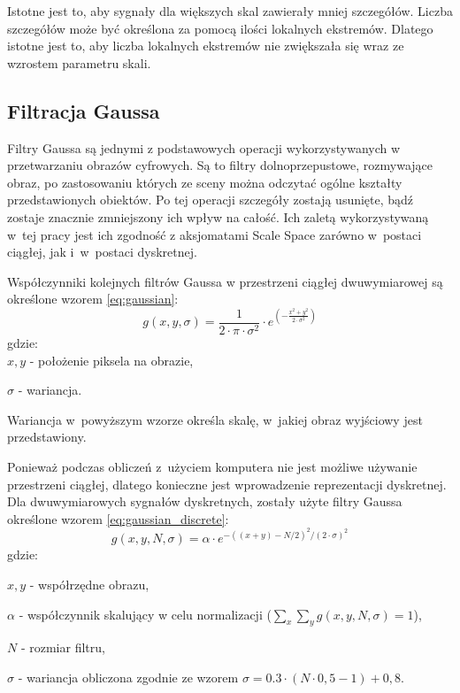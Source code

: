 Istotne jest to, aby sygnały dla większych skal zawierały mniej szczegółów. Liczba szczegółów może być określona za pomocą ilości lokalnych ekstremów. Dlatego istotne jest to, aby liczba lokalnych ekstremów nie zwiększała się wraz ze wzrostem parametru skali.

\subsection{Filtracja Gaussa}
\label{subsec:filtracjaGaussa}
Filtry Gaussa są jednymi z podstawowych operacji wykorzystywanych w przetwarzaniu obrazów cyfrowych. Są to filtry dolnoprzepustowe, rozmywające obraz, po zastosowaniu których ze sceny można odczytać ogólne kształty przedstawionych obiektów. Po tej operacji szczegóły zostają usunięte, bądź zostaje znacznie zmniejszony ich wpływ na całość. Ich zaletą wykorzystywaną w~tej pracy jest ich zgodność z aksjomatami Scale Space zarówno w~postaci ciągłej, jak i~w~postaci dyskretnej.

Współczynniki kolejnych filtrów Gaussa w przestrzeni ciągłej dwuwymiarowej są określone wzorem \ref{eq:gaussian}:
\begin{equation}
\label{eq:gaussian}
g(x,y,\sigma)=\frac{1}{2 \cdot \pi \cdot \sigma^ {2} }\cdot e^{(-\frac{x^{2} + y^{2}}{2 \cdot \sigma ^{2}})}
\end{equation}
gdzie:\\

$ x,y $ - położenie piksela na obrazie,

$ \sigma $ - wariancja.

Wariancja w~powyższym wzorze określa skalę, w~jakiej obraz wyjściowy jest przedstawiony. 

Ponieważ podczas obliczeń z~użyciem komputera nie jest możliwe używanie przestrzeni ciągłej, dlatego konieczne jest wprowadzenie reprezentacji dyskretnej. 
Dla dwuwymiarowych sygnałów dyskretnych, zostały użyte filtry Gaussa określone wzorem \ref{eq:gaussian_discrete}:
\begin{equation}
\label{eq:gaussian_discrete}
g(x,y,N,\sigma) = \alpha \cdot e^{-((x+y)-N/2)^2/(2 \cdot \sigma)^2}
\end{equation}
gdzie:

$ x, y$ - współrzędne obrazu,

$ \alpha $ - współczynnik skalujący w celu normalizacji ($ \sum_x \sum_y g(x,y,N,\sigma) = 1 $),

$ N $ - rozmiar filtru,

$ \sigma $ - wariancja obliczona zgodnie ze wzorem $ \sigma = 0.3 \cdot (N \cdot 0,5 - 1) + 0,8$.

